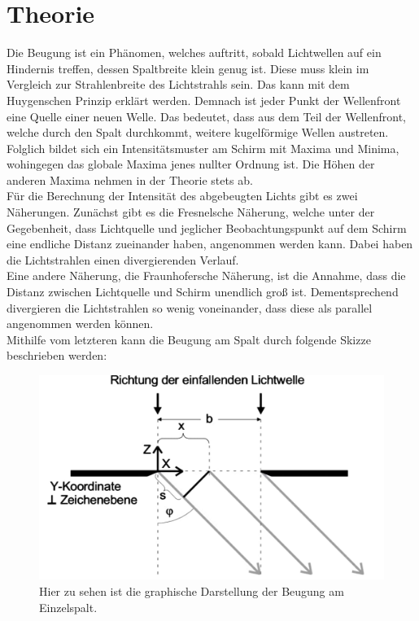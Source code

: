 \section{Theorie}

Die Beugung ist ein Phänomen, welches auftritt, sobald Lichtwellen auf ein Hindernis treffen, dessen Spaltbreite klein genug ist. Diese muss klein im Vergleich zur Strahlenbreite des Lichtstrahls sein. Das kann mit dem Huygenschen Prinzip erklärt werden. Demnach ist jeder Punkt der Wellenfront eine Quelle einer neuen Welle. Das bedeutet, dass aus dem Teil der Wellenfront, welche durch den Spalt durchkommt, weitere kugelförmige Wellen austreten. Folglich bildet sich ein Intensitätsmuster am Schirm mit Maxima und Minima, wohingegen das globale Maxima jenes nullter Ordnung ist. Die Höhen der anderen Maxima nehmen in der Theorie stets ab.\\
Für die Berechnung der Intensität des abgebeugten Lichts gibt es zwei Näherungen. Zunächst gibt es die Fresnelsche Näherung, welche unter der Gegebenheit, dass Lichtquelle und jeglicher Beobachtungspunkt auf dem Schirm eine endliche Distanz zueinander haben, angenommen werden kann. Dabei haben die Lichtstrahlen einen divergierenden Verlauf.\\
Eine andere Näherung, die Fraunhofersche Näherung, ist die Annahme, dass die Distanz zwischen Lichtquelle und Schirm unendlich groß ist. Dementsprechend divergieren die Lichtstrahlen so wenig voneinander, dass diese als parallel angenommen werden können.\\
Mithilfe vom letzteren kann die Beugung am Spalt durch folgende Skizze beschrieben werden:

\begin{figure}
    \centering
    \includegraphics[scale=0.5]{content/Einzelspalt.pdf}
    \caption{Hier zu sehen ist die graphische Darstellung der Beugung am Einzelspalt.}
    \label{fig:one}
\end{figure}

